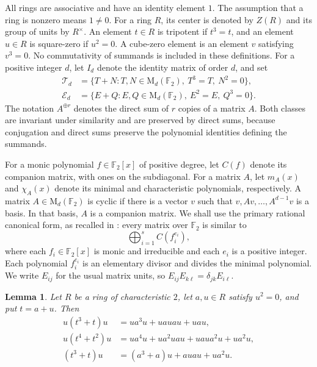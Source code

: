 \documentclass[12pt]{amsart}
\newtheorem{lemma}[theorem]{Lemma}
\theoremstyle{remark}
\numberwithin{equation}{section}
\theoremstyle{definition}
\newcommand{\F}{\mathbb F}
\newcommand{\Mat}{\mathrm M}
\newcommand{\Id}{I}
\newcommand{\TS}{\mathcal T}
\newcommand{\IC}{\mathcal E}
\begin{document}
All rings are associative and have an identity element $1$. The assumption that a ring is nonzero means $1\neq0$. For a ring $R$, its center is denoted by $Z(R)$ and its group of units by $R^\times$. An element $t\in R$ is tripotent if $t^3=t$, and an element $u\in R$ is square-zero if $u^2=0$. A cube-zero element is an element $v$ satisfying $v^3=0$. No commutativity of summands is included in these definitions. For a positive integer $d$, let $\Id_d$ denote the identity matrix of order $d$, and set
\begin{align}
 \TS_d&=\{T+N:T,N\in\Mat_d(\F_2),\ T^3=T,\ N^2=0\},\label{eq:Tset}\\
 \IC_d&=\{E+Q:E,Q\in\Mat_d(\F_2),\ E^2=E,\ Q^3=0\}.\label{eq:Eset}
\end{align}
The notation $A^{\oplus r}$ denotes the direct sum of $r$ copies of a matrix $A$. Both classes are invariant under similarity and are preserved by direct sums, because conjugation and direct sums preserve the polynomial identities defining the summands.

For a monic polynomial $f\in\F_2[x]$ of positive degree, let $C(f)$ denote its companion matrix, with ones on the subdiagonal. For a matrix $A$, let $m_A(x)$ and $\chi_A(x)$ denote its minimal and characteristic polynomials, respectively. A matrix $A\in\Mat_d(\F_2)$ is cyclic if there is a vector $v$ such that $v,Av,\ldots,A^{d-1}v$ is a basis. In that basis, $A$ is a companion matrix. We shall use the primary rational canonical form, as recalled in \cite[Section~2]{DGLPotent}: every matrix over $\F_2$ is similar to
\begin{equation}\label{eq:primary-form}
 \bigoplus_{i=1}^{s} C(f_i^{e_i}),
\end{equation}
where each $f_i\in\F_2[x]$ is monic and irreducible and each $e_i$ is a positive integer. Each polynomial $f_i^{e_i}$ is an elementary divisor and divides the minimal polynomial. We write $E_{ij}$ for the usual matrix units, so $E_{ij}E_{k\ell}=\delta_{jk}E_{i\ell}$.

\begin{lemma}\label{lem:expansions}
Let $R$ be a ring of characteristic $2$, let $a,u\in R$ satisfy $u^2=0$, and put $t=a+u$. Then
\begin{align}
 u(t^3+t)u&=ua^3u+uauau+uau,\label{eq:sandwich3}\\
 u(t^4+t^2)u&=ua^4u+ua^2uau+uaua^2u+ua^2u,\label{eq:sandwich4}\\
 (t^3+t)u&=(a^3+a)u+auau+ua^2u.\label{eq:right3}
\end{align}
\end{lemma}
\end{document}
